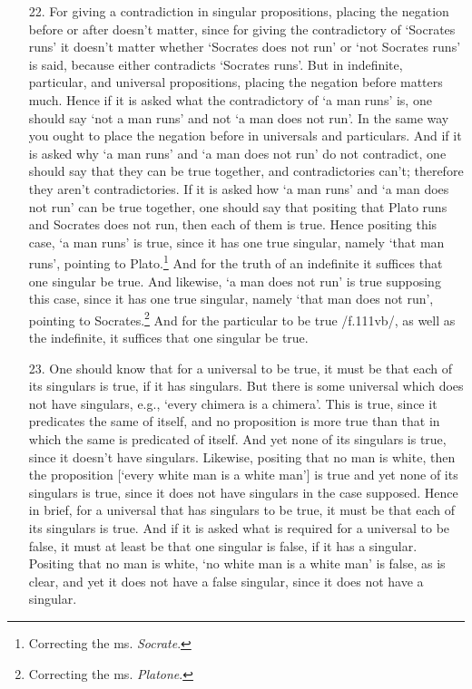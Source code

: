 \documentclass[]{article}
\begin{document}
\begin{enumerate}
\item[22.] For giving a contradiction in singular propositions, placing the negation before or after doesn't matter, since for giving the contradictory of `Socrates runs' it doesn't matter whether `Socrates does not run' or `not Socrates runs' is said, because either contradicts `Socrates runs'. But in indefinite, particular, and universal propositions, placing the negation before matters much. Hence if it is asked what the contradictory of `a man runs' is, one should say `not a man runs' and not `a man does not run'. In the same way you ought to place the negation before in universals and particulars. And if it is asked why `a man runs' and `a man does not run' do not contradict, one should say that they can be true together, and contradictories can't; therefore they aren't contradictories. If it is asked how `a man runs' and `a man does not run' can be true together, one should say that positing that Plato runs and Socrates does not run, then each of them is true. Hence positing this case, `a man runs' is true, since it has one true singular, namely `that man runs', pointing to Plato.\footnote{Correcting the ms. \textit{Socrate}.} And for the truth of an indefinite it suffices that one singular be true. And likewise, `a man does not run' is true supposing this case, since it has one true singular, namely `that man does not run', pointing to Socrates.\footnote{Correcting the ms. \textit{Platone}.} And for the particular to be true /f.111vb/, as well as the indefinite, it suffices that one singular be true.
\item[23.] One should know that for a universal to be true, it must be that each of its singulars is true, if it has singulars. But there is some universal which does not have singulars, e.g., `every chimera is a chimera'. This is true, since it predicates the same of itself, and no proposition is more true than that in which the same is predicated of itself. And yet none of its singulars is true, since it doesn't have singulars. Likewise, positing that no man is white, then the proposition [`every white man is a white man'] is true and yet none of its singulars is true, since it does not have singulars in the case supposed. Hence in brief, for a universal that has singulars to be true, it must be that each of its singulars is true. And if it is asked what is required for a universal to be false, it must at least be that one singular is false, if it has a singular. Positing that no man is white, `no white man is a white man' is false, as is clear, and yet it does not have a false singular, since it does not have a singular.

\end{enumerate}
\end{document}
